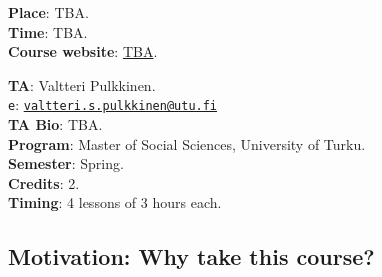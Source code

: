 \documentclass[letterpaper]{article}
\begin{document}
\vspace{5mm}
{\bf Place}: TBA.\\
{\bf Time}: TBA.\\

{\bf Course website}: \href{http://www.hectorbahamonde.com}{TBA}.

\vspace{5mm}
{\bf TA}: Valtteri Pulkkinen.\\
\texttt{e}: \href{mailto:valtteri.s.pulkkinen@utu.fi}{\texttt{valtteri.s.pulkkinen@utu.fi}}\\
{\bf TA Bio}: TBA.\\



\vspace{5mm}
{\bf Program}:  Master of Social Sciences, University of Turku.\\
{\bf Semester}: Spring.\\
{\bf Credits}: 2.\\
{\bf Timing}: 4 lessons of 3 hours each. \\





\subsection*{Motivation: Why take this course?}
\end{document}

